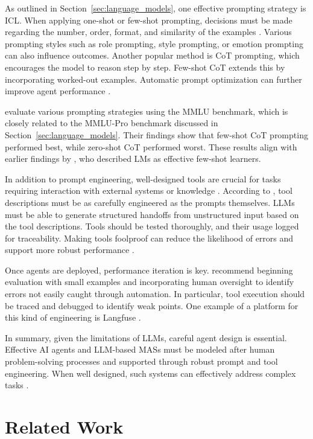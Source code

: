 \documentclass[a4paper,oneside,bibliography=totoc]{scrbook}
\begin{document}
As outlined in Section~\ref{sec:language_models}, one effective prompting strategy is \ac{ICL}. When applying one-shot or few-shot prompting, decisions must be made regarding the number, order, format, and similarity of the examples \cite{Schulhoff2025}. Various prompting styles such as role prompting, style prompting, or emotion prompting can also influence outcomes. Another popular method is \ac{CoT} prompting, which encourages the model to reason step by step. Few-shot \ac{CoT} extends this by incorporating worked-out examples. Automatic prompt optimization can further improve agent performance \cite{Schulhoff2025}.

\citet{Schulhoff2025} evaluate various prompting strategies using the MMLU benchmark, which is closely related to the MMLU-Pro benchmark discussed in Section~\ref{sec:language_models}. Their findings show that few-shot \ac{CoT} prompting performed best, while zero-shot \ac{CoT} performed worst. These results align with earlier findings by \citet{Brown2020}, who described \acp{LM} as effective few-shot learners.

In addition to prompt engineering, well-designed tools are crucial for tasks requiring interaction with external systems or knowledge \cite{OpenAI2025}. According to \citet{Anthropic2024}, tool descriptions must be as carefully engineered as the prompts themselves. \acp{LLM} must be able to generate structured handoffs from unstructured input based on the tool descriptions. Tools should be tested thoroughly, and their usage logged for traceability. Making tools foolproof can reduce the likelihood of errors and support more robust performance \cite{Anthropic2024}.

Once agents are deployed, performance iteration is key. \citet{Hadfield2025} recommend beginning evaluation with small examples and incorporating human oversight to identify errors not easily caught through automation. In particular, tool execution should be traced and debugged to identify weak points. One example of a platform for this kind of engineering is Langfuse \cite{LGFT2025}.

In summary, given the limitations of \acp{LLM}, careful agent design is essential. Effective \ac{AI} agents and \ac{LLM}-based \acp{MAS} must be modeled after human problem-solving processes and supported through robust prompt and tool engineering. When well designed, such systems can effectively address complex tasks \cite{Hadfield2025}.

\chapter{Related Work}
\label{ch:related_work_chapter}
\end{document}
